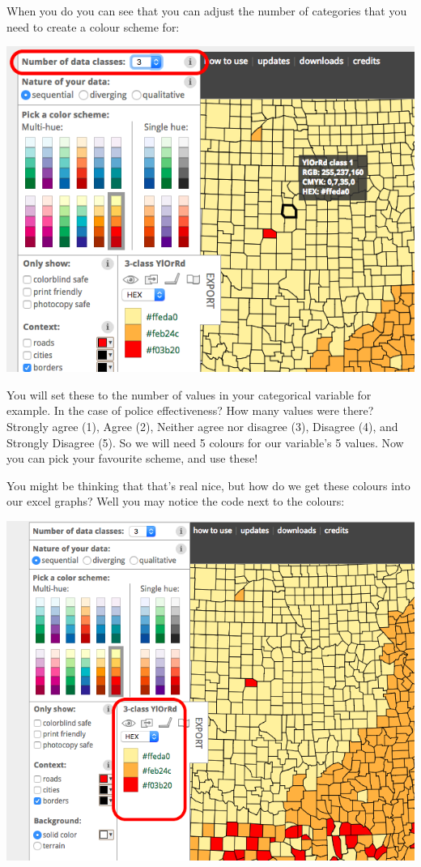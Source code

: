 \documentclass[
]{book}
\begin{document}
When you do you can see that you can adjust the number of categories that you need to create a colour scheme for:

\includegraphics{imgs/choose_col_num.png}

You will set these to the number of values in your categorical variable for example. In the case of police effectiveness? How many values were there? Strongly agree (1), Agree (2), Neither agree nor disagree (3), Disagree (4), and Strongly Disagree (5). So we will need 5 colours for our variable's 5 values. Now you can pick your favourite scheme, and use these!

You might be thinking that that's real nice, but how do we get these colours into our excel graphs? Well you may notice the code next to the colours:

\includegraphics{imgs/how_to_copy_cols.png}
\end{document}
